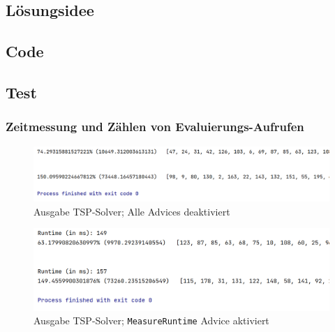 \documentclass[german,notitlepage,smartquotes]{hgbreport}
\begin{document}
\subsection{Lösungsidee}

\subsection{Code}








\clearpage

\subsection{Test}

\subsubsection{Zeitmessung und Zählen von Evaluierungs-Aufrufen}

\begin{figure}[h]
\centering
\includegraphics[width=.9\textwidth]{tsp-test-00}
\caption{Ausgabe TSP-Solver; Alle Advices deaktiviert}
\label{tsp-test-00}
\end{figure}

\begin{figure}[h]
\centering
\includegraphics[width=.9\textwidth]{tsp-test-01}
\caption{Ausgabe TSP-Solver; \texttt{MeasureRuntime} Advice aktiviert}
\label{tsp-test-01}
\end{figure}
\end{document}
